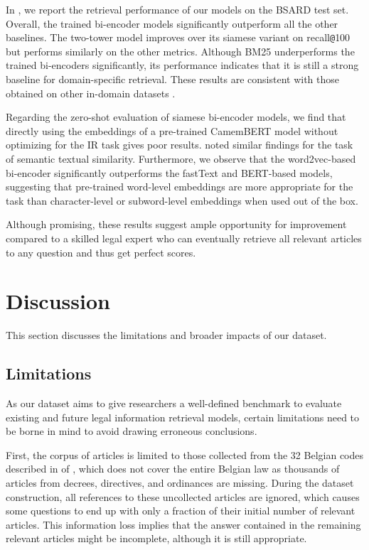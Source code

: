 \documentclass[11pt]{article}
\makeatletter
\newcommand{\at}{\texttt{@}}
\makeatother
\begin{document}
In , we report the retrieval performance of our models on the BSARD test set. Overall, the trained bi-encoder models significantly outperform all the other baselines. The two-tower model improves over its siamese variant on recall\at100 but performs similarly on the other metrics. Although BM25 underperforms the trained bi-encoders significantly, its performance indicates that it is still a strong baseline for domain-specific retrieval. These results are consistent with those obtained on other in-domain datasets \citep{thakur2021beir}.

Regarding the zero-shot evaluation of siamese bi-encoder models, we find that directly using the embeddings of a pre-trained CamemBERT model without optimizing for the IR task gives poor results. \citet{reimers2019sentence} noted similar findings for the task of semantic textual similarity. Furthermore, we observe that the word2vec-based bi-encoder significantly outperforms the fastText and BERT-based models, suggesting that pre-trained word-level embeddings are more appropriate for the task than character-level or subword-level embeddings when used out of the box.

Although promising, these results suggest ample opportunity for improvement compared to a skilled legal expert who can eventually retrieve all relevant articles to any question and thus get perfect scores.



\section{Discussion \label{sec:discussion}}
This section discusses the limitations and broader impacts of our dataset.

\subsection{Limitations}
As our dataset aims to give researchers a well-defined benchmark to evaluate existing and future legal information retrieval models, certain limitations need to be borne in mind to avoid drawing erroneous conclusions. 

First, the corpus of articles is limited to those collected from the 32 Belgian codes described in  of , which does not cover the entire Belgian law as thousands of articles from decrees, directives, and ordinances are missing. During the dataset construction, all references to these uncollected articles are ignored, which causes some questions to end up with only a fraction of their initial number of relevant articles. This information loss implies that the answer contained in the remaining relevant articles might be incomplete, although it is still appropriate.
\end{document}

